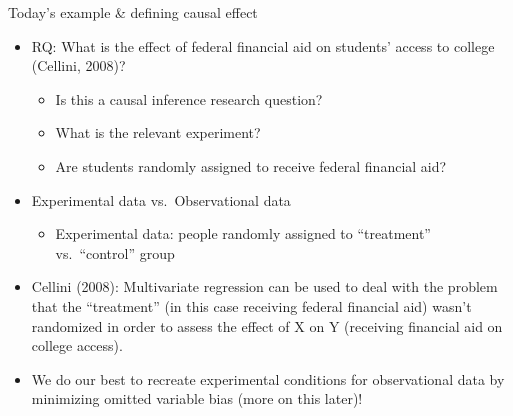 \documentclass[
  8pt,
  ignorenonframetext,
  dvipsnames]{beamer}
\providecommand{\tightlist}{%
  \setlength{\itemsep}{0pt}\setlength{\parskip}{0pt}}
\let\olditem\item
\renewcommand{\item}{%
  \olditem\vspace{4pt}
}
\begin{document}
\begin{frame}{Today's example \& defining causal effect}
\protect\hypertarget{todays-example-defining-causal-effect}{}

\begin{itemize}
\tightlist
\item
  RQ: What is the effect of federal financial aid on students' access to
  college (Cellini, 2008)?

  \begin{itemize}
  \tightlist
  \item
    Is this a causal inference research question?
  \item
    What is the relevant experiment?
  \item
    Are students randomly assigned to receive federal financial aid?
  \end{itemize}
\item
  Experimental data vs.~Observational data

  \begin{itemize}
  \tightlist
  \item
    Experimental data: people randomly assigned to ``treatment''
    vs.~``control'' group
  \end{itemize}
\item
  Cellini (2008): Multivariate regression can be used to deal with the
  problem that the ``treatment'' (in this case receiving federal
  financial aid) wasn't randomized in order to assess the effect of X on
  Y (receiving financial aid on college access).
\item
  We do our best to recreate experimental conditions for observational
  data by minimizing omitted variable bias (more on this later)!
\end{itemize}

\end{frame}
\end{document}
